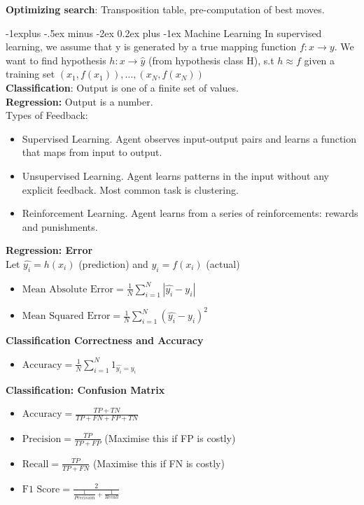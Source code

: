 \documentclass[10pt,landscape]{article}
\makeatletter
\renewcommand{\subsection}{\@startsection{subsection}{2}{0mm}%
                                {-1explus -.5ex minus -2ex}%
                                {0.2ex plus -1ex}%
                                {\normalfont\small\bfseries}}
\makeatother
\begin{document}
\begin{multicols}{3}
\begin{scriptsize}
\textbf{Optimizing search}: Transposition table, pre-computation of best moves.

\subsection{Machine Learning}
In supervised learning, we assume that y is generated by a true mapping function $f : x \rightarrow y$. 
We want to find hypothesis $h : x \rightarrow \hat{y}$ (from hypothesis class H), s.t $h \approx f$
given a training set ${(x_1, f(x_1)), \ldots, (x_N, f(x_N))}$\\
\textbf{Classification}: Output is one of a finite set of values.\\
\textbf{Regression:} Output is a number.\\
Types of Feedback:
 \begin{itemize}
  \item Supervised Learning. Agent observes input-output
  pairs and learns a function that maps from input to output.
  \item Unsupervised Learning. Agent learns patterns in the
  input without any explicit feedback. Most common task
  is clustering.
  \item Reinforcement Learning. Agent learns from a series
  of reinforcements: rewards and punishments.
\end{itemize}

\textbf{Regression: Error}\\
Let $\hat{y_i} = h(x_i)$ (prediction) and $y_i = f(x_i)$ (actual)
\begin{itemize}
  \item $\text{Mean Absolute Error} = \frac{1}{N} \sum_{i=1}^{N} | \hat{y_i} - y_i |$
  \item $\text{Mean Squared Error} = \frac{1}{N} \sum_{i=1}^{N} (\hat{y_i} - y_i)^2$
\end{itemize}
\textbf{Classification Correctness and Accuracy}\\
\begin{itemize}
  \item $\text{Accuracy} = \frac{1}{N} \sum_{i=1}^{N} 1_{\hat{y_i} = y_i}$
\end{itemize}

\textbf{Classification: Confusion Matrix}\\
\begin{itemize}
  \item $\text{Accuracy} = \frac{TP + TN}{TP + FN + FP + TN}$
  \item $\text{Precision} = \frac{TP}{TP + FP}$ (Maximise this if FP is costly)
  \item $\text{Recall} = \frac{TP}{TP + FN}$ (Maximise this if FN is costly)
  \item $\text{F1 Score} = \frac{2}{\frac{1}{Precision} + \frac{1}{Recall}}$
\end{itemize}


\end{scriptsize}
\end{multicols}
\end{document}
